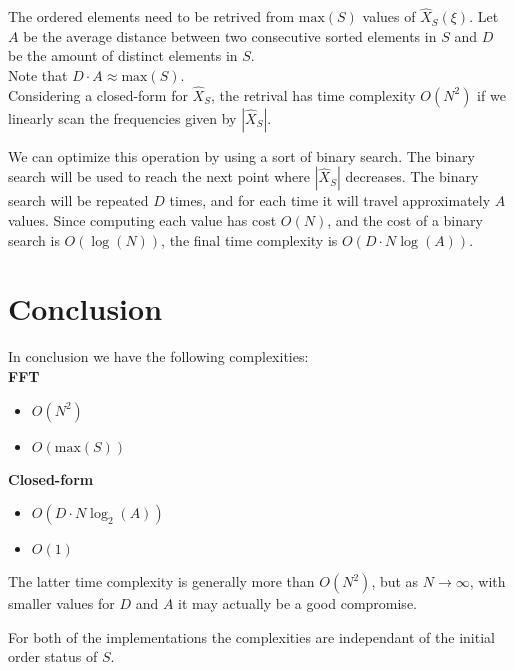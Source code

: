 \documentclass{article}
\begin{document}
The ordered elements need to be retrived from \(\text{max}(S)\) values of
\(\hat{X}_S(\xi)\). Let \(A\) be the average distance between two consecutive sorted
elements in \(S\) and \(D\) be the amount of distinct elements in \(S\).\\
Note that \(D \cdot A \approx \text{max}(S)\).
\\
Considering a closed-form for \(\hat{X}_S\), the retrival has time complexity
\(O(N^2)\) if we linearly scan the frequencies given by \(|\hat{X}_S|\).

We can optimize this operation by using a sort of binary search.
The binary search will be used to reach the next point where \(|\hat{X}_S|\) decreases.
The binary search will be repeated \(D\) times, and for each time
it will travel approximately \(A\) values. Since computing each value has cost \(O(N)\),
and the cost of a binary search is \(O(\log(N))\),
the final time complexity is \(O(D\cdot N \log(A))\).

\section{Conclusion}

In conclusion we have the following complexities: \\
\textbf{FFT}
\begin{itemize}
    \item {} \(O(N^2)\)
    \item {} \(O(\text{max}(S))\)
\end{itemize}
\textbf{Closed-form}
\begin{itemize}
    \item {} \(O(D\cdot N \log_2(A))\)
    \item {} \(O(1)\)
\end{itemize}

The latter time complexity is generally more than \(O(N^2)\),
but as \(N \to \infty\), with smaller values for \(D\) and \(A\) it may actually
be a good compromise.

For both of the implementations the complexities are independant
of the initial order status of \(S\).

\nocite{*} %

\printbibliography
\end{document}
